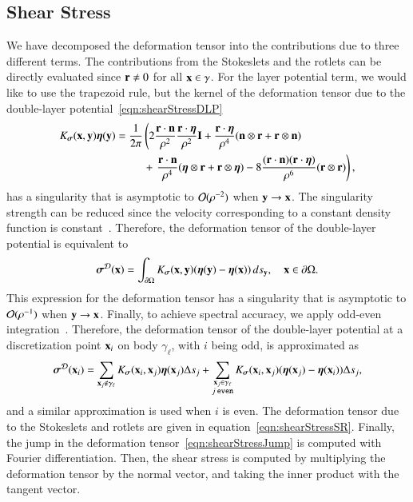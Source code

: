 \documentclass[preprint, 10pt]{elsarticle}
\begin{document}
\subsection{Shear Stress}
\label{sec:shearStress}
We have decomposed the deformation tensor into the contributions due to
three different terms.  The contributions from the Stokeslets and the
rotlets can be directly evaluated since ${\mathbf{r}} \neq 0$ for all ${\mathbf{x}} \in
\gamma$.  For the layer potential term, we would like to use the
trapezoid rule, but the kernel of the deformation tensor due to the
double-layer potential~\eqref{eqn:shearStressDLP} 
\begin{align*}
  K_{\boldsymbol\sigma}({\mathbf{x}},{\mathbf{y}}){\boldsymbol\eta}({\mathbf{y}}) &= \frac{1}{2\pi} \left(
    2\frac{{\mathbf{r}} \cdot {\mathbf{n}}}{\rho^2} \frac{{\mathbf{r}} \cdot {\boldsymbol\eta}}{\rho^2} {\mathbf{I}} + 
    \frac{{\mathbf{r}} \cdot {\boldsymbol\eta}}{\rho^4} ({\mathbf{n}} \otimes {\mathbf{r}} + {\mathbf{r}} \otimes {\mathbf{n}})
    \right. \\ & \hspace{25pt}+ \left.
    \frac{{\mathbf{r}} \cdot {\mathbf{n}}}{\rho^4} ({\boldsymbol\eta} \otimes {\mathbf{r}} + {\mathbf{r}} \otimes {\boldsymbol\eta}) - 
    8\frac{({\mathbf{r}} \cdot {\mathbf{n}})({\mathbf{r}} \cdot {\boldsymbol\eta})}{\rho^6}({\mathbf{r}} \otimes {\mathbf{r}})
  \right),
\end{align*}
has a singularity that is asymptotic to ${\mathcal{O}}(\rho^{-2})$ when ${\mathbf{y}}
\rightarrow {\mathbf{x}}$.  The singularity strength can be reduced since the
velocity corresponding to a constant density function is
constant~\cite{poz1992}.  Therefore, the deformation tensor of the
double-layer potential is equivalent to
\begin{align*}
  {\boldsymbol\sigma}^{{\mathcal{D}}}({\mathbf{x}}) = \int_{{\partial}\Omega}K_{\boldsymbol\sigma}({\mathbf{x}},{\mathbf{y}})
      ({\boldsymbol\eta}({\mathbf{y}}) - {\boldsymbol\eta}({\mathbf{x}})) \, ds_{{\mathbf{y}}}, \quad {\mathbf{x}} \in {\partial}\Omega.
\end{align*}
This expression for the deformation tensor has a singularity that is
asymptotic to ${\mathcal{O}}(\rho^{-1})$ when ${\mathbf{y}} \rightarrow {\mathbf{x}}$.  Finally,
to achieve spectral accuracy, we apply odd-even
integration~\cite{sid-isr1988}.  Therefore, the deformation tensor of
the double-layer potential at a discretization point ${\mathbf{x}}_i$ on body
$\gamma_\ell$, with $i$ being odd, is approximated as
\begin{align}
  {\boldsymbol\sigma}^{{\mathcal{D}}}({\mathbf{x}}_i) = \sum_{{\mathbf{x}}_j \notin \gamma_\ell}
    K_{\boldsymbol\sigma}({\mathbf{x}}_i,{\mathbf{x}}_j) {\boldsymbol\eta}({\mathbf{x}}_j) \Delta s_j + 
  \sum_{\substack{{\mathbf{x}}_j \in \gamma_\ell \\ j \: \mathtt{even}}}
    K_{\boldsymbol\sigma}({\mathbf{x}}_i,{\mathbf{x}}_j) ({\boldsymbol\eta}({\mathbf{x}}_j) - {\boldsymbol\eta}({\mathbf{x}}_i)) \Delta s_j,
  \label{eqn:stressOddEven}
\end{align}
and a similar approximation is used when $i$ is even.  The deformation
tensor due to the Stokeslets and rotlets are given in
equation~\eqref{eqn:shearStressSR}.  Finally, the jump in the
deformation tensor~\eqref{eqn:shearStressJump} is computed with Fourier
differentiation.  Then, the shear stress is computed by multiplying the
deformation tensor by the normal vector, and taking the inner product
with the tangent vector.
\end{document}
